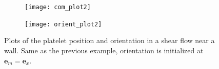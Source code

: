 \documentclass{article}
\newcommand{\vect}[1]{\boldsymbol{\mathbf{#1}}}
\begin{document}
\begin{figure}
  \centering
  \begin{subfigure}{0.49\textwidth}
    \texttt{[image: com\_plot2]}
  \end{subfigure}
  \hfill
  \begin{subfigure}{0.49\textwidth}
    \texttt{[image: orient\_plot2]}
  \end{subfigure}
  \caption{Plots of the platelet position and orientation in a shear
    flow near a wall. Same as the previous example, orientation is
    initialized at $\vect{e}_m = \vect{e}_x$.}
  \label{fig:com_plot2}
\end{figure}



\end{document}
